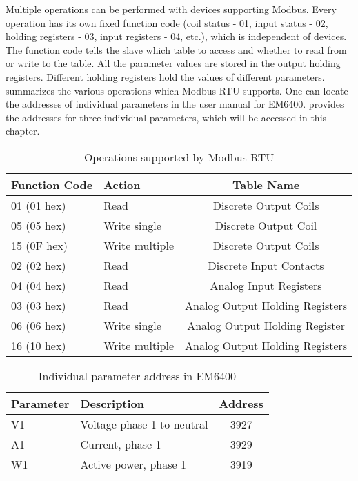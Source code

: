 Multiple operations can be performed with devices supporting Modbus.
Every operation has its own fixed function code (coil status - 01,
input status - 02, holding registers - 03, input registers - 04, etc.),
which is independent of devices. The function code tells the slave which
table to access and whether to read from or write to the table.
All the parameter values are stored in the output holding registers.
Different holding registers hold the values of different parameters.
 summarizes the various operations which
Modbus RTU supports. One can locate the addresses of individual parameters
in the user manual for EM6400.  provides the addresses
for three individual parameters, which will be accessed in this chapter.


\begin{table}
  \centering
  \caption{Operations supported by Modbus RTU}
  \label{tab:modbus-fun-codes}
  \begin{tabular}{llc}\hline
    Function Code & Action         & Table Name                      \\  \hline
    01 (01 hex)   & Read           & Discrete Output Coils           \\
    05 (05 hex)   & Write single   & Discrete Output Coil            \\
    15 (0F hex)   & Write multiple & Discrete Output Coils           \\
    02 (02 hex)   & Read           & Discrete Input Contacts         \\
    04 (04 hex)   & Read           & Analog Input Registers          \\
    03 (03 hex)   & Read           & Analog Output Holding Registers \\
    06 (06 hex)   & Write single   & Analog Output Holding Register  \\
    16 (10 hex)   & Write multiple & Analog Output Holding Registers \\
    \hline
  \end{tabular}
\end{table}


\begin{table}
  \centering
  \caption{Individual parameter address in EM6400}
  \label{tab:params-addr}
  \begin{tabular}{llc}\hline
    Parameter & Description                & Address \\  \hline
    V1        & Voltage phase 1 to neutral & 3927    \\
    A1        & Current, phase 1           & 3929    \\
    W1        & Active power, phase 1      & 3919    \\
    \hline
  \end{tabular}
\end{table}


